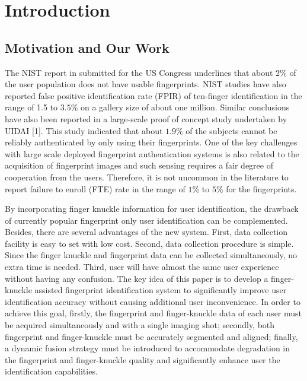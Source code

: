 \hiddenref{}

\section{Introduction\label{introduction}}


\subsection{Motivation and Our Work}

The NIST report in submitted for the US Congress \cite{2002SUMMARYON} underlines that about $2\%$ of the user population does not have usable fingerprints. NIST studies have also reported false positive identification rate (FPIR) of ten-finger identification in the range of 1.5 to $3.5\%$ on a gallery size of about one million. Similar conclusions have also been reported in a large-scale proof of concept study undertaken by UIDAI [1]. This study indicated that about $1.9\%$ of the subjects cannot be reliably authenticated by only using their fingerprints. One of the key challenges with large scale deployed fingerprint authentication systems is also related to the acquisition of fingerprint images and such sensing requires a fair degree of cooperation from the users. Therefore, it is not uncommon in the literature to report failure to enroll (FTE) rate in the range of $1\%$ to $5\%$ for the fingerprints. 

By incorporating finger knuckle information for user identification, the drawback of currently popular fingerprint only user identification can be complemented. Besides, there are several advantages of the new system. First, data collection facility is easy to set with low cost. Second, data collection procedure is simple. Since the finger knuckle and fingerprint data can be collected simultaneously, no extra time is needed. Third, user will have almost the same user experience without having any confusion. The key idea of this paper is to develop a finger-knuckle assisted fingerprint identification system to significantly improve user identification accuracy without causing additional user inconvenience. In order to achieve this goal, firstly, the fingerprint and finger-knuckle data of each user must be acquired simultaneously and with a single imaging shot; secondly, both fingerprint and finger-knuckle must be accurately segmented and aligned; finally, a dynamic fusion strategy must be introduced to accommodate degradation in the fingerprint and finger-knuckle quality and significantly enhance user the identification capabilities. 

